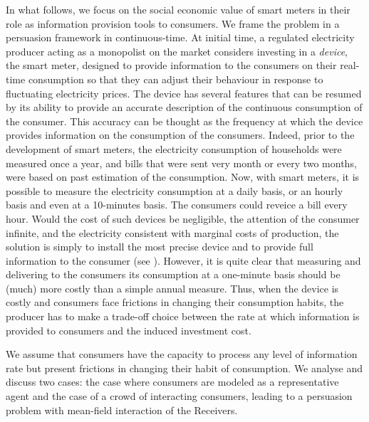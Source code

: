 \documentclass[a4paper,10pt]{article}
\theoremstyle{definition}
\theoremstyle{plain}
\numberwithin{equation}{section}
\begin{document}
\medskip

In what follows, we focus on the social economic value of smart meters in their role as information provision tools to consumers. We frame the problem in a persuasion framework in continuous-time. At initial time, a regulated electricity producer acting as a monopolist on the market considers investing in a {\em device}, the smart meter, designed to provide information to the consumers on their real-time consumption so that they can adjust their behaviour in response to fluctuating electricity prices. The device has several features that can be resumed by its ability to provide an accurate description of the continuous consumption of the consumer. This accuracy can be thought as the frequency at which the device provides information on the consumption of the consumers. Indeed, prior to the development of smart meters, the electricity consumption of households were measured once a year, and bills that were sent very month or every two months, were based on past estimation of the consumption. Now, with smart meters, it is possible to measure the electricity consumption at a daily basis, or an hourly basis and even at a 10-minutes basis. The consumers could reveice a bill every hour.  Would the cost of such devices be negligible, the attention of the consumer infinite, and the electricity consistent with marginal costs of production, the solution is simply to install the most precise device and to provide full information to the consumer (see \cite{Aid23}). However, it is quite clear that measuring and delivering to the consumers its consumption at a one-minute basis should be (much) more costly than a simple annual measure. Thus,  when the device is costly and consumers face frictions in changing their consumption habits, the producer has to make a trade-off choice between the rate at which information is provided to consumers and the induced investment cost. 

\medskip

We assume that consumers have the capacity to process any level of information rate but present frictions in changing their habit of consumption. 
We analyse and discuss two cases: the case where consumers are modeled as a representative agent and the case of a crowd of interacting consumers, leading to a persuasion problem with mean-field interaction of the Receivers.

\medskip
\end{document}

